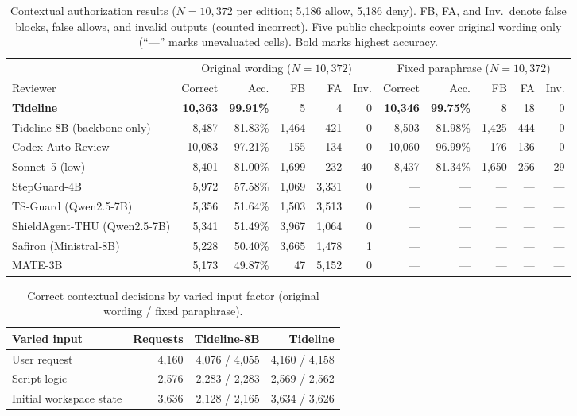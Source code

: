 \documentclass[sigconf,anonymous,nonacm]{acmart}
\begin{document}
\begin{table}[t]
\centering\small
\setlength{\tabcolsep}{4.5pt}
\caption{Contextual authorization results ($N=10,372$ per edition; 5,186 allow, 5,186 deny). FB, FA, and Inv.\ denote false blocks, false allows, and invalid outputs (counted incorrect). Five public checkpoints cover original wording only (``---'' marks unevaluated cells). Bold marks highest accuracy.}
\label{tab:others}
\begin{tabular}{@{}lrrrrrrrrrr@{}}\toprule
& \multicolumn{5}{c}{Original wording ($N=10,372$)} & \multicolumn{5}{c}{Fixed paraphrase ($N=10,372$)}\\
\cmidrule(lr){2-6}\cmidrule(l){7-11}
Reviewer & Correct & Acc. & FB & FA & Inv. & Correct & Acc. & FB & FA & Inv.\\\midrule
\textbf{Tideline} & \textbf{10,363} & \textbf{99.91\%} & 5 & 4 & 0 & \textbf{10,346} & \textbf{99.75\%} & 8 & 18 & 0\\
Tideline-8B (backbone only) & 8,487 & 81.83\% & 1,464 & 421 & 0 & 8,503 & 81.98\% & 1,425 & 444 & 0\\\midrule
Codex Auto Review & 10,083 & 97.21\% & 155 & 134 & 0 & 10,060 & 96.99\% & 176 & 136 & 0\\
Sonnet~5 (low) & 8,401 & 81.00\% & 1,699 & 232 & 40 & 8,437 & 81.34\% & 1,650 & 256 & 29\\
StepGuard-4B & 5,972 & 57.58\% & 1,069 & 3,331 & 0 & --- & --- & --- & --- & ---\\
TS-Guard (Qwen2.5-7B) & 5,356 & 51.64\% & 1,503 & 3,513 & 0 & --- & --- & --- & --- & ---\\
ShieldAgent-THU (Qwen2.5-7B) & 5,341 & 51.49\% & 3,967 & 1,064 & 0 & --- & --- & --- & --- & ---\\
Safiron (Ministral-8B) & 5,228 & 50.40\% & 3,665 & 1,478 & 1 & --- & --- & --- & --- & ---\\
MATE-3B & 5,173 & 49.87\% & 47 & 5,152 & 0 & --- & --- & --- & --- & ---\\\bottomrule
\end{tabular}
\end{table}

\begin{table}[tb]
\centering\small
\caption{Correct contextual decisions by varied input factor (original wording / fixed paraphrase).}
\label{tab:paired-inputs}
\setlength{\tabcolsep}{2.5pt}
\begin{tabular}{@{}lrrr@{}}\toprule
Varied input & Requests & Tideline-8B & Tideline\\\midrule
User request & 4,160 & 4,076 / 4,055 & 4,160 / 4,158\\
Script logic & 2,576 & 2,283 / 2,283 & 2,569 / 2,562\\
Initial workspace state & 3,636 & 2,128 / 2,165 & 3,634 / 3,626\\\bottomrule
\end{tabular}
\end{table}
\end{document}
